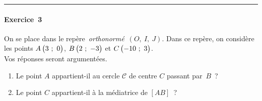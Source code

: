 \documentclass[a4paper,12pt,twocolumn,landscape]{article}
\newcommand{\rep}[3]{~$\left(#1,~#2,~#3\right)$}
\begin{document}
\begin{minipage}{0.45\textwidth}
\vspace*{2em}

\hrule

\vspace*{2em}

\paragraph{Exercice~3} %
On se place dans le repère~\emph{orthonormé}\rep{O}{I}{J}. Dans ce repère, on considère les points $A\begin{pmatrix}3~;~0\end{pmatrix}$, $B\begin{pmatrix}2~;~-3\end{pmatrix}$ et $C\begin{pmatrix}-10~;~3\end{pmatrix}$.\\Vos réponses seront argumentées.

	\begin{enumerate}
		\item Le point $A$ appartient-il au cercle $\mathscr{C}$ de centre $C$ passant par~$B$~?
		\item Le point $C$ appartient-il à la médiatrice de $\left[AB\right]$~?
	\end{enumerate}



\vspace{-2em}


\end{minipage}
\newpage

\vspace*{1em}
\end{document}
